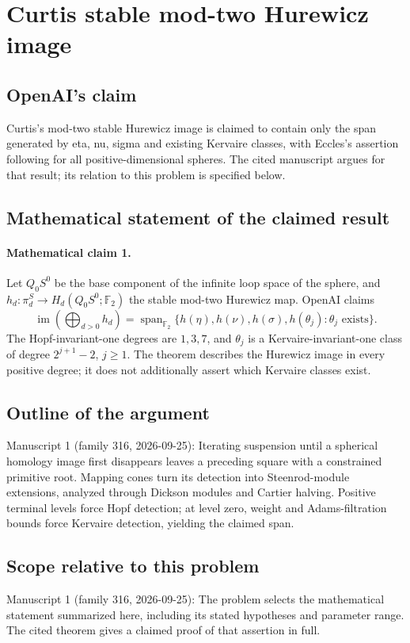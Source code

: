 \documentclass[11pt]{article}
\begin{document}
\section*{Curtis stable mod-two Hurewicz image}

\subsection{OpenAI's claim}
Curtis's mod-two stable Hurewicz image is claimed to contain only the span generated by eta, nu, sigma and existing Kervaire classes, with Eccles's assertion following for all positive-dimensional spheres. The cited manuscript argues for that result; its relation to this problem is specified below.

\subsection{Mathematical statement of the claimed result}
\paragraph{Mathematical claim 1.} Let $Q_0S^0$ be the base component of the infinite loop space of the sphere, and $h_d:\pi_d^S\to H_d(Q_0S^0;\mathbb F_2)$ the stable mod-two Hurewicz map. OpenAI claims
\[
\operatorname{im}\!\left(\bigoplus_{d>0}h_d\right)
=\operatorname{span}_{\mathbb F_2}\{h(\eta),h(\nu),h(\sigma),h(\theta_j):\theta_j\text{ exists}\}.
\]
The Hopf-invariant-one degrees are $1,3,7$, and $\theta_j$ is a Kervaire-invariant-one class of degree $2^{j+1}-2$, $j\ge1$. The theorem describes the Hurewicz image in every positive degree; it does not additionally assert which Kervaire classes exist.

\subsection{Outline of the argument}
Manuscript 1 (family 316, 2026-09-25): Iterating suspension until a spherical homology image first disappears leaves a preceding square with a constrained primitive root. Mapping cones turn its detection into Steenrod-module extensions, analyzed through Dickson modules and Cartier halving. Positive terminal levels force Hopf detection; at level zero, weight and Adams-filtration bounds force Kervaire detection, yielding the claimed span.

\subsection{Scope relative to this problem}
Manuscript 1 (family 316, 2026-09-25): The problem selects the mathematical statement summarized here, including its stated hypotheses and parameter range. The cited theorem gives a claimed proof of that assertion in full.
\end{document}
